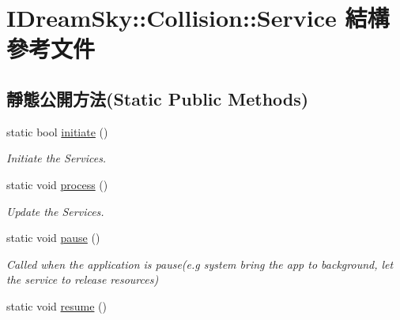 \hypertarget{struct_i_dream_sky_1_1_collision_1_1_service}{}\section{I\+Dream\+Sky\+:\+:Collision\+:\+:Service 結構 參考文件}
\label{struct_i_dream_sky_1_1_collision_1_1_service}
\subsection*{靜態公開方法(Static Public Methods)}
\begin{DoxyCompactItemize}
\item 
static bool \hyperlink{struct_i_dream_sky_1_1_collision_1_1_service_a7e0cf15658cca7dce73643930655295a}{initiate} ()
\begin{DoxyCompactList}\small\item\em Initiate the Services. \end{DoxyCompactList}\item 
static void \hyperlink{struct_i_dream_sky_1_1_collision_1_1_service_a7c3de75d56b3189c49b43f9c022fdd94}{process} ()\hypertarget{struct_i_dream_sky_1_1_collision_1_1_service_a7c3de75d56b3189c49b43f9c022fdd94}{}\label{struct_i_dream_sky_1_1_collision_1_1_service_a7c3de75d56b3189c49b43f9c022fdd94}

\begin{DoxyCompactList}\small\item\em Update the Services. \end{DoxyCompactList}\item 
static void \hyperlink{struct_i_dream_sky_1_1_collision_1_1_service_ad5be58e933712d3ce52f95866104890f}{pause} ()\hypertarget{struct_i_dream_sky_1_1_collision_1_1_service_ad5be58e933712d3ce52f95866104890f}{}\label{struct_i_dream_sky_1_1_collision_1_1_service_ad5be58e933712d3ce52f95866104890f}

\begin{DoxyCompactList}\small\item\em Called when the application is pause(e.\+g system bring the app to background, let the service to release resources) \end{DoxyCompactList}\item 
static void \hyperlink{struct_i_dream_sky_1_1_collision_1_1_service_a76cf143b5816755474d6a960b22d39e7}{resume} ()\hypertarget{struct_i_dream_sky_1_1_collision_1_1_service_a76cf143b5816755474d6a960b22d39e7}{}\label{struct_i_dream_sky_1_1_collision_1_1_service_a76cf143b5816755474d6a960b22d39e7}


\end{DoxyCompactItemize}

